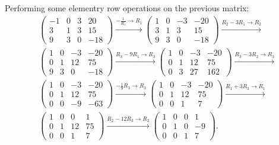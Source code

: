 \begin{example}
  Performing some elementry row operations on the previous matrix:
  \begin{align*}
  &
  \left(\begin{array}{ccc|c}
    -1 & 0 & 3 & 20\\
    3  & 1 & 3 & 15\\
    9  & 3 & 0 & -18
  \end{array}\right) \xrightarrow[] {-\frac{1}{R_{1}} \rightarrow R_{1}}
  \left(\begin{array}{ccc|c}
    1 & 0 & -3 & -20\\
    3  & 1 & 3 & 15\\
    9  & 3 & 0 & -18
  \end{array}\right) \xrightarrow[] {R_{2}-3R_{1} \rightarrow R_{2}}\\
  &
  \left(\begin{array}{ccc|c}
    1 & 0 & -3 & -20\\
    0  & 1 & 12 & 75\\
    9  & 3 & 0 & -18
  \end{array}\right) \xrightarrow[] {R_{3}-9R_{1} \rightarrow R_{3}}
  \left(\begin{array}{ccc|c}
    1 & 0 & -3 & -20\\
    0  & 1 & 12 & 75\\
    0  & 3 & 27 & 162
  \end{array}\right) \xrightarrow[] {R_{3}-3R_{2} \rightarrow R_{3}}\\
  &
  \left(\begin{array}{ccc|c}
    1 & 0 & -3 & -20\\
    0  & 1 & 12 & 75\\
    0  & 0 & -9 & -63 
  \end{array}\right) \xrightarrow[] {-\frac{1}{9}R_{3} \rightarrow R_{3}}
  \left(\begin{array}{ccc|c}
    1 & 0 & -3 & -20\\
    0  & 1 & 12 & 75\\
    0  & 0 & 1 & 7 
  \end{array}\right) \xrightarrow[] {R_{1}+3R_{3} \rightarrow R_{1}}\\
  &
  \left(\begin{array}{ccc|c}
    1 & 0 & 0 & 1\\
    0  & 1 & 12 & 75\\
    0  & 0 & 1 & 7 
  \end{array}\right) \xrightarrow[] {R_{2}-12R_{3} \rightarrow R_{2}}
  \left(\begin{array}{ccc|c}
    1 & 0 & 0 & 1\\
    0  & 1 & 0 & -9\\
    0  & 0 & 1 & 7 
  \end{array}\right).
  \end{align*}
\end{example}

